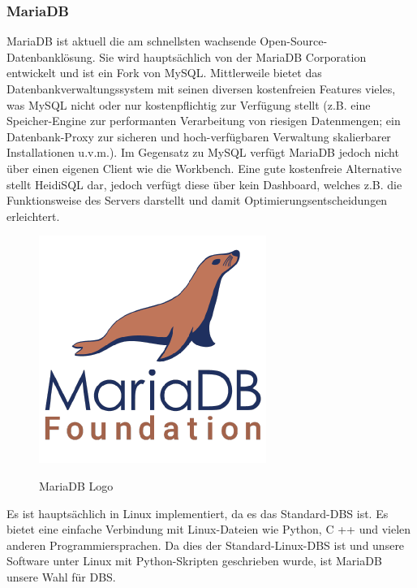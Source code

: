 \subsubsection{MariaDB}
MariaDB ist aktuell die am schnellsten wachsende Open-Source-Datenbanklösung. Sie wird hauptsächlich von der MariaDB Corporation entwickelt und ist ein Fork von MySQL. Mittlerweile bietet das Datenbankverwaltungssystem mit seinen diversen kostenfreien Features vieles, was MySQL nicht oder nur kostenpflichtig zur Verfügung stellt (z.B. eine Speicher-Engine zur performanten Verarbeitung von riesigen Datenmengen; ein Datenbank-Proxy zur sicheren und hoch-verfügbaren Verwaltung skalierbarer Installationen u.v.m.). Im Gegensatz zu MySQL verfügt MariaDB jedoch nicht über einen eigenen Client wie die Workbench. Eine gute kostenfreie Alternative stellt HeidiSQL dar, jedoch verfügt diese über kein Dashboard, welches z.B. die Funktionsweise des Servers darstellt und damit Optimierungsentscheidungen erleichtert.\cite{MariaDB-Monitor}
\begin{figure}[h]
	\centering
	\includegraphics[scale=0.3]{./figures/mariadb.png}
	\caption{ MariaDB Logo}
	\label{fig:mariadb}
	\cite{MariaDBlogo}
\end{figure}
\bigbreak
Es ist hauptsächlich in Linux implementiert, da es das Standard-DBS ist. Es bietet eine einfache Verbindung mit Linux-Dateien wie Python, C ++ und vielen anderen Programmiersprachen. Da dies der Standard-Linux-DBS ist und unsere Software unter Linux mit Python-Skripten geschrieben wurde, ist MariaDB unsere Wahl für DBS.

